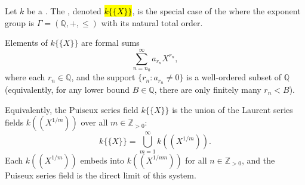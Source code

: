 \begin{definition} \label{definition:puiseux_series_field_in_one_variable_over_a_field}
Let $k$ be a . The , denoted \hl{$k\{\{X\}\}$}, is the special case of the  where the exponent group is $\Gamma = (\mathbb{Q}, +, \leq)$ with its natural total order.

Elements of $k\{\{X\}\}$ are formal sums
$$\sum_{n=n_0}^{\infty} a_{r_n} X^{r_n},$$
where each $r_n \in \mathbb{Q}$, and the support $\{r_n : a_{r_n} \neq 0\}$ is a well-ordered subset of $\mathbb{Q}$ (equivalently, for any lower bound $B \in \mathbb{Q}$, there are only finitely many $r_n < B$).

Equivalently, the Puiseux series field $k\{\{X\}\}$ is the union of the Laurent series fields $k((X^{1/m}))$ over all $m \in \mathbb{Z}_{>0}$:
$$k\{\{X\}\} = \bigcup_{m=1}^{\infty} k((X^{1/m})).$$
Each $k((X^{1/m}))$ embeds into $k((X^{1/nm}))$ for all $n \in \mathbb{Z}_{>0}$, and the Puiseux series field is the direct limit of this system.
\end{definition}
